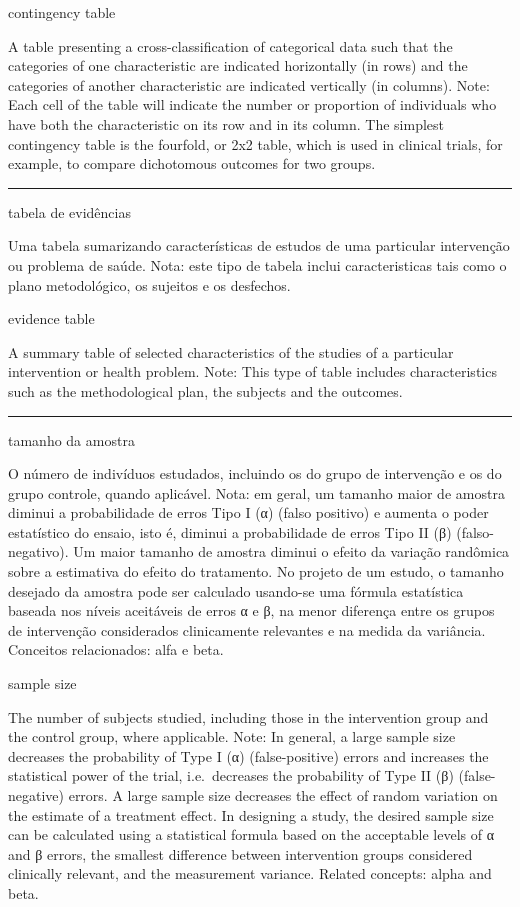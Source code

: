 \documentclass[
  openany]{book}
\begin{document}
contingency table

A table presenting a cross-classification of categorical data such that the categories of one characteristic are indicated horizontally (in rows) and the categories of another characteristic are indicated vertically (in columns). Note: Each cell of the table will indicate the number or proportion of individuals who have both the characteristic on its row and in its column. The simplest contingency table is the fourfold, or 2x2 table, which is used in clinical trials, for example, to compare dichotomous outcomes for two groups.

\begin{center}\rule{0.5\linewidth}{0.5pt}\end{center}

tabela de evidências

Uma tabela sumarizando características de estudos de uma particular intervenção ou problema de saúde. Nota: este tipo de tabela inclui caracteristicas tais como o plano metodológico, os sujeitos e os desfechos.

evidence table

A summary table of selected characteristics of the studies of a particular intervention or health problem. Note: This type of table includes characteristics such as the methodological plan, the subjects and the outcomes.

\begin{center}\rule{0.5\linewidth}{0.5pt}\end{center}

tamanho da amostra

O número de indivíduos estudados, incluindo os do grupo de intervenção e os do grupo controle, quando aplicável. Nota: em geral, um tamanho maior de amostra diminui a probabilidade de erros Tipo I (α) (falso positivo) e aumenta o poder estatístico do ensaio, isto é, diminui a probabilidade de erros Tipo II (β) (falso-negativo). Um maior tamanho de amostra diminui o efeito da variação randômica sobre a estimativa do efeito do tratamento. No projeto de um estudo, o tamanho desejado da amostra pode ser calculado usando-se uma fórmula estatística baseada nos níveis aceitáveis de erros α e β, na menor diferença entre os grupos de intervenção considerados clinicamente relevantes e na medida da variância. Conceitos relacionados: alfa e beta.

sample size

The number of subjects studied, including those in the intervention group and the control group, where applicable. Note: In general, a large sample size decreases the probability of Type I (α) (false-positive) errors and increases the statistical power of the trial, i.e.~decreases the probability of Type II (β) (false-negative) errors. A large sample size decreases the effect of random variation on the estimate of a treatment effect. In designing a study, the desired sample size can be calculated using a statistical formula based on the acceptable levels of α and β errors, the smallest difference between intervention groups considered clinically relevant, and the measurement variance. Related concepts: alpha and beta.
\end{document}
